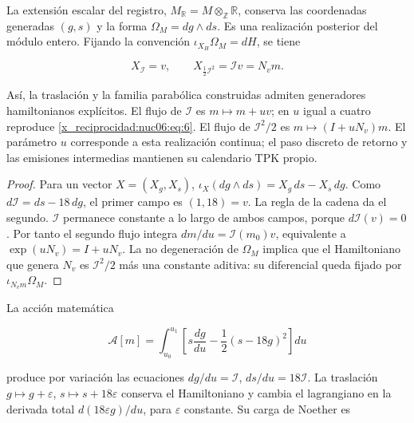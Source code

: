 \begin{theorem}
\label{x_reciprocidad:nuc06:variacional}

La extensión escalar del registro, \(M_{\mathbb R}=M\otimes_{\mathbb Z}\mathbb R\), conserva las coordenadas generadas \((g,s)\) y la forma \(\Omega_M=dg\wedge ds\). Es una realización posterior del módulo entero. Fijando la convención \(\iota_{X_H}\Omega_M=dH\), se tiene

\begin{equation}
X_{\mathcal I}=v,\qquad
X_{\frac12\mathcal I^2}=\mathcal I v=N_vm.
\label{x_reciprocidad:nuc06:eq:12a}
\end{equation}

Así, la traslación y la familia parabólica construidas admiten generadores hamiltonianos explícitos. El flujo de \(\mathcal I\) es \(m\mapsto m+uv\); en \(u\) igual a cuatro reproduce \eqref{x_reciprocidad:nuc06:eq:6}. El flujo de \(\mathcal I^2/2\) es \(m\mapsto(I+uN_v)m\). El parámetro \(u\) corresponde a esta realización continua; el paso discreto de retorno y las emisiones intermedias mantienen su calendario TPK propio.
\end{theorem}

\begin{proof}
Para un vector \(X=(X_g,X_s)\), \(\iota_X(dg\wedge ds)=X_g\,ds-X_s\,dg\). Como \(d\mathcal I=ds-18\,dg\), el primer campo es \((1,18)=v\). La regla de la cadena da el segundo. \(\mathcal I\) permanece constante a lo largo de ambos campos, porque \(d\mathcal I(v)=0\). Por tanto el segundo flujo integra \(dm/du=\mathcal I(m_0)v\), equivalente a \(\exp(uN_v)=I+uN_v\). La no degeneración de \(\Omega_M\) implica que el Hamiltoniano que genera \(N_v\) es \(\mathcal I^2/2\) más una constante aditiva: su diferencial queda fijado por \(\iota_{N_vm}\Omega_M\).
\end{proof}

La acción matemática

\begin{equation}
\mathscr A[m]=\int_{u_0}^{u_1}
\left[s\frac{dg}{du}-\frac12(s-18g)^2\right]du
\label{x_reciprocidad:nuc06:eq:12b}
\end{equation}

produce por variación las ecuaciones \(dg/du=\mathcal I\), \(ds/du=18\mathcal I\). La traslación \(g\mapsto g+\varepsilon\), \(s\mapsto s+18\varepsilon\) conserva el Hamiltoniano y cambia el lagrangiano en la derivada total \(d(18\varepsilon g)/du\), para \(\varepsilon\) constante. Su carga de Noether es

